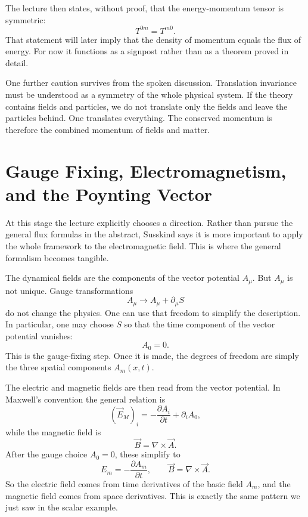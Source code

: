 The lecture then states, without proof, that the energy-momentum tensor is symmetric:
\begin{equation}
T^{0m}=T^{m0}.
\end{equation}
That statement will later imply that the density of momentum equals the flux of energy. For now it functions as a signpost rather than as a theorem proved in detail.

One further caution survives from the spoken discussion. Translation invariance must be understood as a symmetry of the whole physical system. If the theory contains fields and particles, we do not translate only the fields and leave the particles behind. One translates everything. The conserved momentum is therefore the combined momentum of fields and matter.

\section{Gauge Fixing, Electromagnetism, and the Poynting Vector}

At this stage the lecture explicitly chooses a direction. Rather than pursue the general flux formulas in the abstract, Susskind says it is more important to apply the whole framework to the electromagnetic field. This is where the general formalism becomes tangible.

The dynamical fields are the components of the vector potential \(A_\mu\). But \(A_\mu\) is not unique. Gauge transformations
\begin{equation}
A_\mu\to A_\mu+\partial_\mu S
\end{equation}
do not change the physics. One can use that freedom to simplify the description. In particular, one may choose \(S\) so that the time component of the vector potential vanishes:
\begin{equation}
A_0=0.
\end{equation}
This is the gauge-fixing step. Once it is made, the degrees of freedom are simply the three spatial components \(A_m(x,t)\).

The electric and magnetic fields are then read from the vector potential. In Maxwell's convention the general relation is
\begin{equation}
(\vec E_M)_i=-\frac{\partial A_i}{\partial t}+\partial_iA_0,
\end{equation}
while the magnetic field is
\begin{equation}
\vec B=\nabla\times\vec A.
\end{equation}
After the gauge choice \(A_0=0\), these simplify to
\begin{equation}
E_m=-\frac{\partial A_m}{\partial t},
\qquad
\vec B=\nabla\times\vec A.
\end{equation}
So the electric field comes from time derivatives of the basic field \(A_m\), and the magnetic field comes from space derivatives. This is exactly the same pattern we just saw in the scalar example.

